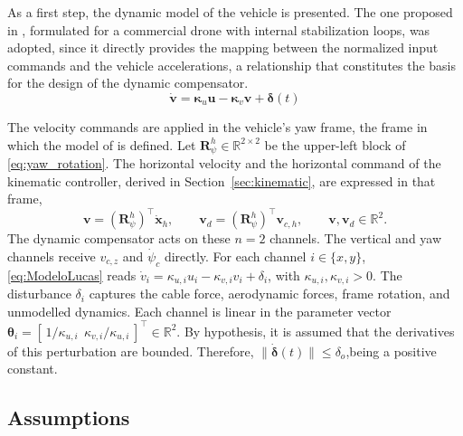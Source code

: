 \documentclass[sn-mathphys-num]{sn-jnl}
\theoremstyle{thmstyleone}%
\theoremstyle{thmstyletwo}%
\theoremstyle{thmstylethree}%
\begin{document}
As a first step, the dynamic model of the vehicle is presented. The one proposed in \cite{Lucas_ICUAS2014}, formulated for a commercial drone with internal stabilization loops, was adopted, since it directly provides the mapping between the normalized input commands and the vehicle accelerations, a relationship that constitutes the basis for the design of the dynamic compensator.
\begin{equation}\label{eq:ModeloLucas}
    \dot{\mathbf{v}} = \boldsymbol{\kappa}_u\mathbf{u} - \boldsymbol{\kappa}_v\mathbf{v} +\boldsymbol{\delta}(t)
\end{equation}

The velocity commands are applied in the vehicle's yaw frame, the frame in which the model of \cite{Lucas_ICUAS2014} is defined. Let $\mathbf{R}_\psi^{h}\in\mathbb{R}^{2\times 2}$ be the upper-left block of \eqref{eq:yaw_rotation}. The horizontal velocity and the horizontal command of the kinematic controller, derived in Section~\ref{sec:kinematic}, are expressed in that frame,
\begin{equation}\label{eq:yaw_frame}
\mathbf{v} = (\mathbf{R}_\psi^{h})^{\top}\dot{\mathbf{x}}_h,\qquad
\mathbf{v}_d = (\mathbf{R}_\psi^{h})^{\top}\mathbf{v}_{c,h},\qquad \mathbf{v},\mathbf{v}_d\in\mathbb{R}^{2}.
\end{equation}
The dynamic compensator acts on these $n=2$ channels. The vertical and yaw channels receive $v_{c,z}$ and $\dot\psi_c$ directly. For each channel $i\in\{x,y\}$, \eqref{eq:ModeloLucas} reads $\dot v_i=\kappa_{u,i}u_i-\kappa_{v,i}v_i+\delta_i$, with $\kappa_{u,i},\kappa_{v,i}>0$. The disturbance $\delta_i$ captures the cable force, aerodynamic forces, frame rotation, and unmodelled dynamics. Each channel is linear in the parameter vector $\boldsymbol{\theta}_i=[\,1/\kappa_{u,i}\ \ \kappa_{v,i}/\kappa_{u,i}\,]^{\top}\in\mathbb{R}^{2}$.
By hypothesis, it is assumed that the derivatives of this perturbation are bounded. Therefore, $\|\dot{ \boldsymbol{\delta}}(t)\| \leq \delta_o$,being a positive constant.


\subsection{Assumptions}\label{sec:assumptions}
\end{document}
